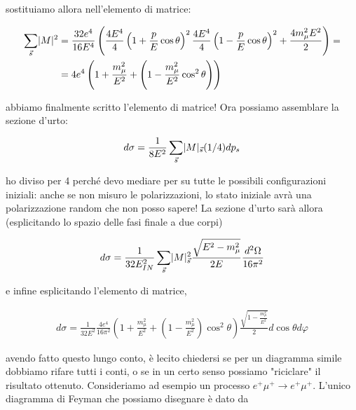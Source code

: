 \documentclass[11pt]{report}
\begin{document}
sostituiamo allora nell'elemento di matrice: 

\begin{align}
    \sum_{\vec{s}}\lvert M\rvert^2 &= \frac{32e^4}{16E^4}\left(\frac{4E^4}{4}\left(1 + \frac{p}{E}\cos\theta\right)^2 \frac{4E^4}{4}\left(1 - \frac{p}{E}\cos\theta\right)^2  +\frac{4m_\mu^2E^2}{2}\right) = \\
    &= 4e^4\left(1 + \frac{m_\mu^2}{E^2} + \left(1 - \frac{m_\mu^2}{E^2}\cos^2\theta \right)\right)
\end{align}


abbiamo finalmente scritto l'elemento di matrice! Ora possiamo assemblare la sezione d'urto: 

\begin{align}
    d\sigma = \frac{1}{8E^2}\sum_{\vec{s}}\lvert M\rvert_{\vec{s}}(1/4)dp_s
\end{align}

ho diviso per 4 perché devo mediare per su tutte le possibili configurazioni iniziali: anche se non misuro le polarizzazioni, lo stato iniziale avrà una polarizzazione random che non posso sapere! La sezione d'urto sarà allora (esplicitando lo spazio delle fasi finale a due corpi)

\begin{align}
    d\sigma = \frac{1}{32E^2_{IN}}\sum_{\vec{s}}\lvert M\rvert_{\vec{s}}^2 \frac{\sqrt{E^2-m_\mu^2}}{2E}\frac{d^2\Omega}{16\pi^2}
\end{align}

e infine esplicitando l'elemento di matrice, 

\begin{align}
    d\sigma = \frac{1}{32E^2}\frac{4e^4}{16\pi^2}\left(1 + \frac{m^2_\mu}{E^2} + \left(1 - \frac{m_\mu^2}{E^2} \right)\cos^2\theta \right)\frac{\sqrt{1 - \frac{m_\mu^2}{E^2}}}{2}d\cos\theta d\varphi
\end{align}


avendo fatto questo lungo conto, è lecito chiedersi se per un diagramma simile dobbiamo rifare tutti i conti, o se in un certo senso possiamo "riciclare" il risultato ottenuto. Consideriamo ad esempio un processo \(e^+\mu^+ \rightarrow e^+\mu^+\). L'unico diagramma di Feyman che possiamo disegnare è dato da 

\begin{center}
\end{center}
\end{document}
